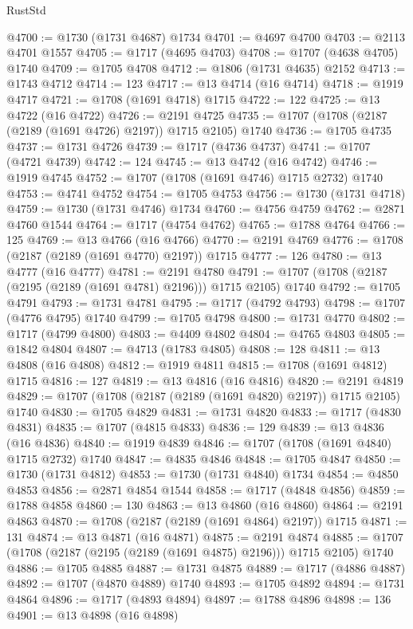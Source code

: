 \begin{lexlean}{RustStd}
\begin{coremodule}
@4700 := @1730 (@1731 @4687) @1734
@4701 := @4697 @4700
@4703 := @2113 @4701 @1557
@4705 := @1717 (@4695 @4703)
@4708 := @1707 (@4638 @4705) @1740
@4709 := @1705 @4708
@4712 := @1806 (@1731 @4635) @2152
@4713 := @1743 @4712
@4714 := 123
@4717 := @13 @4714 (@16 @4714)
@4718 := @1919 @4717
@4721 := @1708 (@1691 @4718) @1715
@4722 := 122
@4725 := @13 @4722 (@16 @4722)
@4726 := @2191 @4725
@4735 := @1707 (@1708 (@2187 (@2189 (@1691 @4726) @2197)) @1715 @2105) @1740
@4736 := @1705 @4735
@4737 := @1731 @4726
@4739 := @1717 (@4736 @4737)
@4741 := @1707 (@4721 @4739)
@4742 := 124
@4745 := @13 @4742 (@16 @4742)
@4746 := @1919 @4745
@4752 := @1707 (@1708 (@1691 @4746) @1715 @2732) @1740
@4753 := @4741 @4752
@4754 := @1705 @4753
@4756 := @1730 (@1731 @4718)
@4759 := @1730 (@1731 @4746) @1734
@4760 := @4756 @4759
@4762 := @2871 @4760 @1544
@4764 := @1717 (@4754 @4762)
@4765 := @1788 @4764
@4766 := 125
@4769 := @13 @4766 (@16 @4766)
@4770 := @2191 @4769
@4776 := @1708 (@2187 (@2189 (@1691 @4770) @2197)) @1715
@4777 := 126
@4780 := @13 @4777 (@16 @4777)
@4781 := @2191 @4780
@4791 := @1707 (@1708 (@2187 (@2195 (@2189 (@1691 @4781) @2196))) @1715 @2105) @1740
@4792 := @1705 @4791
@4793 := @1731 @4781
@4795 := @1717 (@4792 @4793)
@4798 := @1707 (@4776 @4795) @1740
@4799 := @1705 @4798
@4800 := @1731 @4770
@4802 := @1717 (@4799 @4800)
@4803 := @4409 @4802
@4804 := @4765 @4803
@4805 := @1842 @4804
@4807 := @4713 (@1783 @4805)
@4808 := 128
@4811 := @13 @4808 (@16 @4808)
@4812 := @1919 @4811
@4815 := @1708 (@1691 @4812) @1715
@4816 := 127
@4819 := @13 @4816 (@16 @4816)
@4820 := @2191 @4819
@4829 := @1707 (@1708 (@2187 (@2189 (@1691 @4820) @2197)) @1715 @2105) @1740
@4830 := @1705 @4829
@4831 := @1731 @4820
@4833 := @1717 (@4830 @4831)
@4835 := @1707 (@4815 @4833)
@4836 := 129
@4839 := @13 @4836 (@16 @4836)
@4840 := @1919 @4839
@4846 := @1707 (@1708 (@1691 @4840) @1715 @2732) @1740
@4847 := @4835 @4846
@4848 := @1705 @4847
@4850 := @1730 (@1731 @4812)
@4853 := @1730 (@1731 @4840) @1734
@4854 := @4850 @4853
@4856 := @2871 @4854 @1544
@4858 := @1717 (@4848 @4856)
@4859 := @1788 @4858
@4860 := 130
@4863 := @13 @4860 (@16 @4860)
@4864 := @2191 @4863
@4870 := @1708 (@2187 (@2189 (@1691 @4864) @2197)) @1715
@4871 := 131
@4874 := @13 @4871 (@16 @4871)
@4875 := @2191 @4874
@4885 := @1707 (@1708 (@2187 (@2195 (@2189 (@1691 @4875) @2196))) @1715 @2105) @1740
@4886 := @1705 @4885
@4887 := @1731 @4875
@4889 := @1717 (@4886 @4887)
@4892 := @1707 (@4870 @4889) @1740
@4893 := @1705 @4892
@4894 := @1731 @4864
@4896 := @1717 (@4893 @4894)
@4897 := @1788 @4896
@4898 := 136
@4901 := @13 @4898 (@16 @4898)

\end{coremodule}
\end{lexlean}
